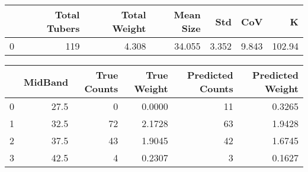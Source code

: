 \begin{tabular}{lrrrrrr}
\toprule
{} &  Total Tubers &  Total Weight &  Mean Size &    Std &    CoV &       K \\
\midrule
0 &           119 &         4.308 &     34.055 &  3.352 &  9.843 &  102.94 \\
\bottomrule
\end{tabular}

\begin{tabular}{lrrrrr}
\toprule
{} &  MidBand &  True Counts &  True Weight &  Predicted Counts &  Predicted Weight \\
\midrule
0 &     27.5 &            0 &       0.0000 &                11 &            0.3265 \\
1 &     32.5 &           72 &       2.1728 &                63 &            1.9428 \\
2 &     37.5 &           43 &       1.9045 &                42 &            1.6745 \\
3 &     42.5 &            4 &       0.2307 &                 3 &            0.1627 \\
\bottomrule
\end{tabular}

